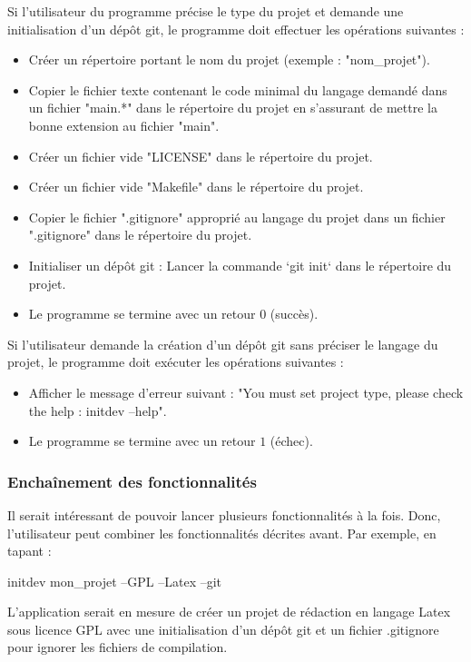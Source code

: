\documentclass[10pt,a4paper]{article}
\begin{document}
Si l'utilisateur du programme précise le type du projet et demande une initialisation d'un dépôt git, le programme doit effectuer les opérations suivantes :
  \begin{itemize}
    \item Créer un répertoire portant le nom du projet (exemple : "nom\_projet").
    \item Copier le fichier texte contenant le code minimal du langage demandé dans un fichier "main.*" dans le  répertoire du projet en s'assurant de mettre la bonne extension au fichier "main".
    \item Créer un fichier vide "LICENSE" dans le répertoire du projet.
    \item Créer un fichier vide "Makefile" dans le  répertoire du projet.
    \item Copier le fichier ".gitignore" approprié au langage du projet dans un fichier ".gitignore" dans le  répertoire du projet.
    \item Initialiser un dépôt git : Lancer la commande `git init` dans le répertoire du projet.
    \item Le programme se termine avec un retour $0$ (succès).
  \end{itemize}

  Si l'utilisateur demande la création d'un dépôt git sans préciser le langage du projet, le programme doit exécuter les opérations suivantes :
  \begin{itemize}
    \item  Afficher le message d'erreur suivant : "You must set project type, please check the help : initdev --help".
    \item Le programme se termine avec un retour $1$ (échec). 
\end{itemize}

\subsubsection{Enchaînement des fonctionnalités}
  Il serait intéressant de pouvoir lancer plusieurs fonctionnalités à la fois. Donc, l'utilisateur peut combiner les fonctionnalités décrites avant. Par exemple, en tapant :
  \begin{center}
    initdev mon\_projet --GPL --Latex --git
  \end{center}
  L'application serait en mesure de créer un projet de rédaction en langage Latex sous licence GPL avec une initialisation d'un dépôt git et un fichier .gitignore pour ignorer les fichiers de compilation.
\end{document}
